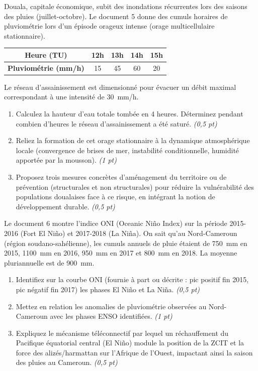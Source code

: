 \documentclass[11pt]{article}
\begin{document}
\begin{exercice}
\label{exo:inondations}
Douala, capitale économique, subit des inondations récurrentes lors des saisons des pluies (juillet-octobre). Le document 5 donne des cumuls horaires de pluviométrie lors d'un épisode orageux intense (orage multicellulaire stationnaire).

\begin{center}
\begin{tabular}{|c|c|c|c|c|}
\hline
\textbf{Heure (TU)} & 12h & 13h & 14h & 15h \\ \hline
\textbf{Pluviométrie (mm/h)} & 15 & 45 & 60 & 20 \\ \hline
\end{tabular}
\end{center}
Le réseau d'assainissement est dimensionné pour évacuer un débit maximal correspondant à une intensité de \SI{30}{mm/h}.

\begin{enumerate}
    \item Calculez la hauteur d'eau totale tombée en 4 heures. Déterminez pendant combien d'heures le réseau d'assainissement a été saturé. \textit{(0,5 pt)}
    \item Reliez la formation de cet orage stationnaire à la dynamique atmosphérique locale (convergence de brises de mer, instabilité conditionnelle, humidité apportée par la mousson). \textit{(1 pt)}
    \item Proposez trois mesures concrètes d'aménagement du territoire ou de prévention (structurales et non structurales) pour réduire la vulnérabilité des populations doualaises face à ce risque, en intégrant la notion de développement durable. \textit{(0,5 pt)}
\end{enumerate}
\end{exercice}

\begin{exercice}
\label{exo:enso}
Le document 6 montre l'indice ONI (Oceanic Niño Index) sur la période 2015-2016 (Fort El Niño) et 2017-2018 (La Niña). On sait qu'au Nord-Cameroun (région soudano-sahélienne), les cumuls annuels de pluie étaient de \SI{750}{mm} en 2015, \SI{1100}{mm} en 2016, \SI{950}{mm} en 2017 et \SI{800}{mm} en 2018. La moyenne pluriannuelle est de \SI{900}{mm}.

\begin{enumerate}
    \item Identifiez sur la courbe ONI (fournie à part ou décrite : pic positif fin 2015, pic négatif fin 2017) les phases El Niño et La Niña. \textit{(0,5 pt)}
    \item Mettez en relation les anomalies de pluviométrie observées au Nord-Cameroun avec les phases ENSO identifiées. \textit{(1 pt)}
    \item Expliquez le mécanisme téléconnectif par lequel un réchauffement du Pacifique équatorial central (El Niño) module la position de la ZCIT et la force des alizés/harmattan sur l'Afrique de l'Ouest, impactant ainsi la saison des pluies au Cameroun. \textit{(0,5 pt)}
\end{enumerate}
\end{exercice}
\end{document}
